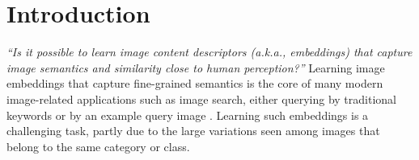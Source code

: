 \documentclass[sigconf]{acmart}
\begin{document}
\newcommand{\pdata}{p_{\rm{data}}}
\newcommand{\ptrain}{\hat{p}_{\rm{data}}}
\newcommand{\Ptrain}{\hat{P}_{\rm{data}}}
\newcommand{\pmodel}{p_{\rm{model}}}
\newcommand{\Pmodel}{P_{\rm{model}}}
\newcommand{\ptildemodel}{\tilde{p}_{\rm{model}}}
\newcommand{\pencode}{p_{\rm{encoder}}}
\newcommand{\pdecode}{p_{\rm{decoder}}}
\newcommand{\precons}{p_{\rm{reconstruct}}}

\newcommand{\laplace}{\mathrm{Laplace}} 

\newcommand{\E}{\mathbb{E}}
\newcommand{\Ls}{\mathcal{L}}
\newcommand{\R}{\mathbb{R}}
\newcommand{\emp}{\tilde{p}}
\newcommand{\lr}{\alpha}
\newcommand{\reg}{\lambda}
\newcommand{\rect}{\mathrm{rectifier}}
\newcommand{\softmax}{\mathrm{softmax}}
\newcommand{\sigmoid}{\sigma}
\newcommand{\softplus}{\zeta}
\newcommand{\KL}{D_{\mathrm{KL}}}
\newcommand{\Var}{\mathrm{Var}}
\newcommand{\standarderror}{\mathrm{SE}}
\newcommand{\Cov}{\mathrm{Cov}}
\newcommand{\normlzero}{L^0}
\newcommand{\normlone}{L^1}
\newcommand{\normltwo}{L^2}
\newcommand{\normlp}{L^p}
\newcommand{\normmax}{L^\infty}

\newcommand{\parents}{Pa} \let\ab\allowbreak
 
\section{Introduction}
\label{sec:introduction}
\begin{comment}
\textit{``How to learn image embeddings that capture fine-grained semantics based on the instance of an image?'' ``Is it possible for such embeddings to further understand image semantics closer to humans' perception?''}  Learning image embeddings that capture fine-grained semantics is the core of many modern image-related applications such as image search, either querying by traditional keywords or by a query image~\cite{murphy2015visual}. However, learning such embeddings is a challenging task, partly due to the large variations among images that belong to the same category or class. For example, within the same semantic class, many factors such as color, shape or texture can still be scaled or translated within an image.
\end{comment}

\textit{``Is it possible to learn image content descriptors (a.k.a., embeddings) that capture image semantics and similarity close to human perception?''} Learning image embeddings that capture fine-grained semantics is the core of many modern image-related applications such as image search, either querying by traditional keywords or by an example query image \cite{murphy2015visual}. Learning such embeddings is a challenging task, partly due to the large variations seen among images that belong to the same category or class.
\end{document}
